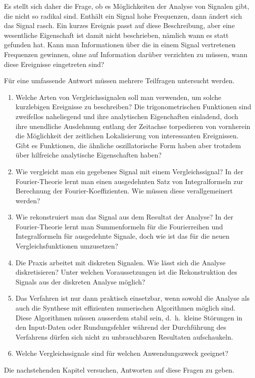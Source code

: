 Es stellt sich daher die Frage, ob es Möglichkeiten der Analyse von Signalen
gibt, die nicht so radikal sind.
Enthält ein Signal hohe Frequenzen, dann ändert sich das Signal rasch.
Ein kurzes Ereignis passt auf diese Beschreibung, aber eine wesentliche
Eigenschaft ist damit nicht beschrieben, nämlich wann es statt gefunden hat.
Kann man Informationen über die in einem Signal vertretenen Frequenzen gewinnen,
ohne auf Information darüber verzichten zu müssen, wann diese Ereignisse
eingetreten sind?

Für eine umfassende Antwort müssen mehrere Teilfragen untersucht werden.
\begin{enumerate}
\item
Welche Arten von Vergleichssignalen soll man verwenden, um solche kurzlebigen
Ereignisse zu beschreiben?
Die trigonometrischen Funktionen sind zweifellos naheliegend und ihre
analytischen Eigenchaften einladend, doch ihre unendliche Ausdehnung entlang
der Zeitachse torpedieren von vornherein die Möglichkeit der zeitlichen
Lokalisierung von interessanten Ereignissen.
Gibt es Funktionen, die ähnliche oszillatorische Form haben
aber trotzdem über hilfreiche analytische Eigenschaften haben?
\item
Wie vergleicht man ein gegebenes Signal mit einem Vergleichssignal?
In der Fourier-Theorie lernt man einen ausgedehnten Satz von Integralformeln
zur Berechnung der Fourier-Koeffizien\-ten.
Wie müssen diese verallgemeinert werden?
\item
Wie rekonstruiert man das Signal aus dem Resultat der Analyse?
In der Fourier-Theorie lernt man Summenformeln für die Fourierreihen
und Integralformeln für ausgedehnte Signale, doch wie ist das für 
die neuen Vergleichsfunktionen umzusetzen?
\item
Die Praxis arbeitet mit diskreten Signalen. 
Wie lässt sich die Analyse diskretisieren?
Unter welchen Voraussetzungen ist die Rekonstruktion des Signals
aus der diskreten Analyse möglich?
\item
Das Verfahren ist nur dann praktisch einsetzbar, wenn sowohl die Analyse als
auch die Synthese mit effizienten numerischen Algorithmen möglich sind.
Diese Algorithmen müssen ausserdem stabil sein, d.~h.~kleine Störungen in
den Input-Daten oder Rundungsfehler während der Durchführung des Verfahrens
dürfen sich nicht zu unbrauchbaren Resultaten aufschaukeln.
\item
Welche Vergleichssignale sind für welchen Anwendungszweck geeignet?
\end{enumerate}
Die nachstehenden Kapitel versuchen, Antworten auf diese Fragen zu
geben.

